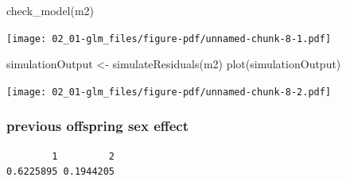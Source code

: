 \documentclass[
  letterpaper,
  DIV=11,
  numbers=noendperiod]{scrreprt}
\newenvironment{Shaded}{\begin{snugshade}}{\end{snugshade}}
\newcommand{\AttributeTok}[1]{\textcolor[rgb]{0.40,0.45,0.13}{#1}}
\newcommand{\ConstantTok}[1]{\textcolor[rgb]{0.56,0.35,0.01}{#1}}
\newcommand{\DecValTok}[1]{\textcolor[rgb]{0.68,0.00,0.00}{#1}}
\newcommand{\FunctionTok}[1]{\textcolor[rgb]{0.28,0.35,0.67}{#1}}
\newcommand{\NormalTok}[1]{\textcolor[rgb]{0.00,0.23,0.31}{#1}}
\newcommand{\OtherTok}[1]{\textcolor[rgb]{0.00,0.23,0.31}{#1}}
\newcommand{\SpecialCharTok}[1]{\textcolor[rgb]{0.37,0.37,0.37}{#1}}
\begin{document}
\begin{Shaded}
\begin{Highlighting}[]
\FunctionTok{check\_model}\NormalTok{(m2)}
\end{Highlighting}
\end{Shaded}

\texttt{[image: 02\_01-glm\_files/figure-pdf/unnamed-chunk-8-1.pdf]}

\begin{Shaded}
\begin{Highlighting}[]
\NormalTok{simulationOutput }\OtherTok{\textless{}{-}} \FunctionTok{simulateResiduals}\NormalTok{(m2)}
\FunctionTok{plot}\NormalTok{(simulationOutput)}
\end{Highlighting}
\end{Shaded}

\texttt{[image: 02\_01-glm\_files/figure-pdf/unnamed-chunk-8-2.pdf]}

\subsubsection{previous offspring sex
effect}\label{previous-offspring-sex-effect}

\begin{Shaded}
\end{Shaded}

\begin{verbatim}
        1         2 
0.6225895 0.1944205 
\end{verbatim}
\end{document}
